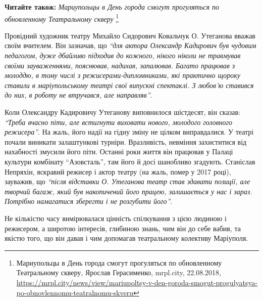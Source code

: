 \textbf{Читайте також:} \emph{Мариупольцы в День города смогут прогуляться по обновленному Театральному скверу}%
\footnote{Мариупольцы в День города смогут прогуляться по обновленному Театральному скверу, Ярослав Герасименко, mrpl.city, 22.08.2018, \url{https://mrpl.city/news/view/mariupoltsy-v-den-goroda-smogut-progulyatsya-po-obnovlennomu-teatralnomu-skveru}}

Провідний художник театру Михайло Сидорович Ковальчук О. Утеганова вважав своїм
вчителем. Він зазначав, що \emph{\enquote{для актора Олександр Кадирович був чудовим
педагогом, дуже дбайливо підходив до кожного, нікого ніколи не травмував своїми
зауваженнями, пояснював, надихав, запалював. Багато працював з молоддю, в тому
числі з режисерами-дипломниками, які практично щороку ставили в маріупольському
театрі свої випускні спектаклі. З любов'ю ставився до них, в роботу не
втручався, але направляв}}.


Коли Олександру Кадировичу Утеганову виповнилося шістдесят, він сказав: \emph{\enquote{Треба
вчасно піти, але встигнути виховати нового, молодого головного режисера}}. На
жаль, його надії на гідну зміну не цілком виправдалися. У театрі почали
виникати залаштункові турніри. Вразливість, невміння захиститися від нахабності
змусили його піти. Останні роки життя він працював у Палаці культури комбінату
\enquote{Азовсталь}, там його й досі шанобливо згадують. Станіслав Непряхін, яскравий
режисер і актор театру (на жаль, помер у 2017 році), зауважив, що \emph{\enquote{після
відставки О. Утеганова театр став здавати позиції, але творчий багаж, який був
накопичений його працею, залишається у нас і зараз. Потрібно намагатися
зберегти і не розгубити його}}.

Не кількістю часу вимірювалася цінність спілкування з цією людиною і режисером,
а широтою інтересів, глибиною знань, чим він до себе вабив, та якістю того, що
він давав і чим допомагав театральному колективу Маріуполя.
